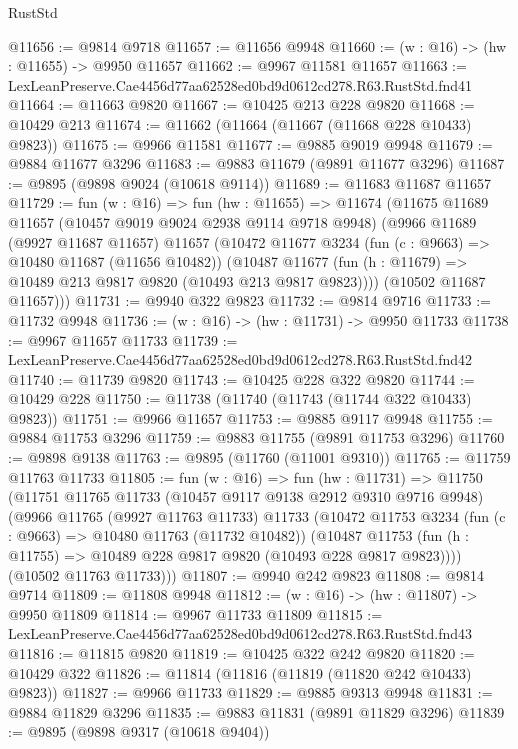 \begin{lexlean}{RustStd}
\begin{coremodule}
@11656 := @9814 @9718
@11657 := @11656 @9948
@11660 := (w : @16) -> (hw : @11655) -> @9950 @11657
@11662 := @9967 @11581 @11657
@11663 := LexLeanPreserve.Cae4456d77aa62528ed0bd9d0612cd278.R63.RustStd.fnd41
@11664 := @11663 @9820
@11667 := @10425 @213 @228 @9820
@11668 := @10429 @213
@11674 := @11662 (@11664 (@11667 (@11668 @228 @10433) @9823))
@11675 := @9966 @11581
@11677 := @9885 @9019 @9948
@11679 := @9884 @11677 @3296
@11683 := @9883 @11679 (@9891 @11677 @3296)
@11687 := @9895 (@9898 @9024 (@10618 @9114))
@11689 := @11683 @11687 @11657
@11729 := fun (w : @16) =>
  fun (hw : @11655) =>
  @11674
    (@11675
      @11689
      @11657
      (@10457 @9019 @9024 @2938 @9114 @9718 @9948)
      (@9966
        @11689
        (@9927 @11687 @11657)
        @11657
        (@10472
          @11677
          @3234
          (fun (c : @9663) => @10480 @11687 (@11656 @10482))
          (@10487 @11677 (fun (h : @11679) => @10489 @213 @9817 @9820 (@10493 @213 @9817 @9823))))
        (@10502 @11687 @11657)))
@11731 := @9940 @322 @9823
@11732 := @9814 @9716
@11733 := @11732 @9948
@11736 := (w : @16) -> (hw : @11731) -> @9950 @11733
@11738 := @9967 @11657 @11733
@11739 := LexLeanPreserve.Cae4456d77aa62528ed0bd9d0612cd278.R63.RustStd.fnd42
@11740 := @11739 @9820
@11743 := @10425 @228 @322 @9820
@11744 := @10429 @228
@11750 := @11738 (@11740 (@11743 (@11744 @322 @10433) @9823))
@11751 := @9966 @11657
@11753 := @9885 @9117 @9948
@11755 := @9884 @11753 @3296
@11759 := @9883 @11755 (@9891 @11753 @3296)
@11760 := @9898 @9138
@11763 := @9895 (@11760 (@11001 @9310))
@11765 := @11759 @11763 @11733
@11805 := fun (w : @16) =>
  fun (hw : @11731) =>
  @11750
    (@11751
      @11765
      @11733
      (@10457 @9117 @9138 @2912 @9310 @9716 @9948)
      (@9966
        @11765
        (@9927 @11763 @11733)
        @11733
        (@10472
          @11753
          @3234
          (fun (c : @9663) => @10480 @11763 (@11732 @10482))
          (@10487 @11753 (fun (h : @11755) => @10489 @228 @9817 @9820 (@10493 @228 @9817 @9823))))
        (@10502 @11763 @11733)))
@11807 := @9940 @242 @9823
@11808 := @9814 @9714
@11809 := @11808 @9948
@11812 := (w : @16) -> (hw : @11807) -> @9950 @11809
@11814 := @9967 @11733 @11809
@11815 := LexLeanPreserve.Cae4456d77aa62528ed0bd9d0612cd278.R63.RustStd.fnd43
@11816 := @11815 @9820
@11819 := @10425 @322 @242 @9820
@11820 := @10429 @322
@11826 := @11814 (@11816 (@11819 (@11820 @242 @10433) @9823))
@11827 := @9966 @11733
@11829 := @9885 @9313 @9948
@11831 := @9884 @11829 @3296
@11835 := @9883 @11831 (@9891 @11829 @3296)
@11839 := @9895 (@9898 @9317 (@10618 @9404))

\end{coremodule}
\end{lexlean}
